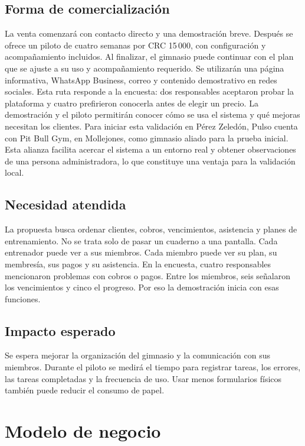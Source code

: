 \subsection{Forma de comercialización}

La venta comenzará con contacto directo y una demostración breve. Después
se ofrece un piloto de cuatro semanas por CRC 15\,000, con configuración y
acompañamiento incluidos. Al finalizar, el gimnasio puede continuar con el plan
que se ajuste a su uso y acompañamiento requerido. Se utilizarán una página informativa,
WhatsApp Business, correo y contenido demostrativo en redes sociales. Esta ruta
responde a la encuesta: dos responsables aceptaron probar la plataforma y cuatro
prefirieron conocerla antes de elegir un precio. La demostración y el piloto
permitirán conocer cómo se usa el sistema y qué mejoras necesitan los clientes.
Para iniciar esta validación en Pérez Zeledón, Pulso cuenta con Pit Bull Gym, en
Mollejones, como gimnasio aliado para la prueba inicial. Esta alianza facilita
acercar el sistema a un entorno real y obtener observaciones de una persona
administradora, lo que constituye una ventaja para la validación local.

\subsection{Necesidad atendida}

La propuesta busca ordenar clientes, cobros, vencimientos, asistencia y planes
de entrenamiento. No se trata solo de pasar un cuaderno a una pantalla. Cada
entrenador puede ver a sus miembros. Cada miembro puede ver su plan, su
membresía, sus pagos y su asistencia. En la encuesta, cuatro responsables
mencionaron problemas con cobros o pagos. Entre los miembros, seis señalaron los
vencimientos y cinco el progreso. Por eso la demostración inicia con esas
funciones.

\subsection{Impacto esperado}

Se espera mejorar la organización del gimnasio y la comunicación con sus
miembros. Durante el piloto se medirá el tiempo para registrar tareas, los
errores, las tareas completadas y la frecuencia de uso. Usar menos formularios
físicos también puede reducir el consumo de papel.

\section{Modelo de negocio}

